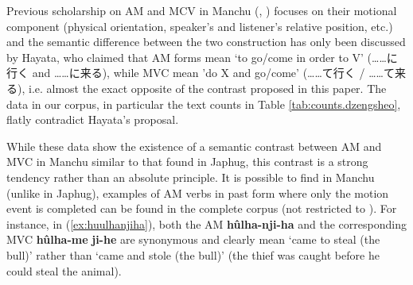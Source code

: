 \documentclass{article}
\newcommand{\ipa}[1]{\textbf{{\phon\mbox{#1}}}} %
\newcommand{\zh}[1]{{\cn#1}}
\begin{document}
Previous scholarship on AM and MCV in Manchu (\citealt{hayata95yuku}, \citealt{kubo97come}) focuses on their motional component (physical orientation, speaker’s and listener’s relative position, etc.) and the semantic difference between the two construction has only been discussed by Hayata, who claimed that AM forms mean ‘to go/come in order to V’ (\zh{……に行く} and \zh{……に来る}), while MVC mean 'do X and go/come' (\zh{……て行く} / \zh{……て来る}), i.e. almost the exact opposite of the contrast proposed in this paper. The data in our corpus, in particular the text counts in Table \ref{tab:counts.dzengsheo}, flatly contradict Hayata's proposal.

While these data show the existence of a semantic contrast between AM and MVC in Manchu similar to that found in Japhug, this contrast is a strong tendency rather than an absolute principle. It is possible to find in Manchu (unlike in Japhug), examples of AM verbs in past form where only the motion event is completed can be found in the complete corpus (not restricted to \citet{cosmo06dzengseo}). For instance,  in (\ref{ex:huulhanjiha}), both the AM \ipa{hûlha-nji-ha} and the corresponding MVC \ipa{hûlha-me} \ipa{ji-he} are synonymous and clearly mean `came to steal (the bull)' rather than `came and stole (the bull)' (the thief was caught before he could steal the animal).
\end{document}
